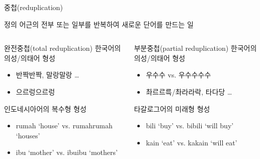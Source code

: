\documentclass[11pt, aspectratio=169]{beamer}
\begin{document}
\begin{frame}[t]{중첩(reduplication)}
  \begin{block}{정의}
    어근의 전부 또는 일부를 반복하여 새로운 단어를 만드는 일
  \end{block}
  \begin{columns}
    \begin{column}[T]{0.46\textwidth}
      \begin{block}{완전중첩(total reduplication)}
        한국어의 의성/의태어 형성
        \begin{itemize}
          \item 반짝반짝, 말랑말랑 \dots
          \item 으르렁으르렁
        \end{itemize}
        인도네시아어의 복수형 형성
        \begin{itemize}
          \item rumah ‘house’ vs. rumahrumah ‘houses’
          \item ibu ‘mother’ vs. ibuibu ‘mothers’
        \end{itemize}
      \end{block}      
    \end{column}
    \begin{column}[T]{0.47\textwidth}
      \begin{block}{부분중첩(partial reduplication)}
        한국어의 의성/의태어 형성
        \begin{itemize}
          \item 우수수 vs. 우수수수수
          \item 촤르르륵/촤라라락, 타다당 \dots
        \end{itemize}
        타갈로그어의 미래형 형성
        \begin{itemize}
          \item bili ‘buy’ vs. bibili ‘will buy’
          \item kain ‘eat’ vs. kakain ‘will eat’
        \end{itemize}
      \end{block}     
    \end{column}
  \end{columns}
\end{frame}
\end{document}
